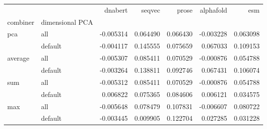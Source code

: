 \begin{tabular}{llrrrrr}
\toprule
 &  & dnabert & seqvec & prose & alphafold & esm \\
combiner & dimensional PCA &  &  &  &  &  \\
\midrule
\multirow[t]{2}{*}{pca} & all & -0.005314 & 0.064490 & 0.066430 & -0.003228 & 0.063098 \\
 & default & -0.004117 & 0.145555 & 0.075659 & 0.067033 & 0.109153 \\
\cline{1-7}
\multirow[t]{2}{*}{average} & all & -0.005307 & 0.085411 & 0.070529 & -0.000876 & 0.054788 \\
 & default & -0.003264 & 0.138811 & 0.092746 & 0.067431 & 0.106074 \\
\cline{1-7}
\multirow[t]{2}{*}{sum} & all & -0.005312 & 0.085411 & 0.070529 & -0.000876 & 0.054788 \\
 & default & 0.006822 & 0.075365 & 0.084606 & 0.006121 & 0.034575 \\
\cline{1-7}
\multirow[t]{2}{*}{max} & all & -0.005648 & 0.078479 & 0.107831 & -0.006607 & 0.080722 \\
 & default & -0.003445 & 0.009905 & 0.122704 & 0.027285 & 0.031228 \\
\cline{1-7}
\bottomrule
\end{tabular}
